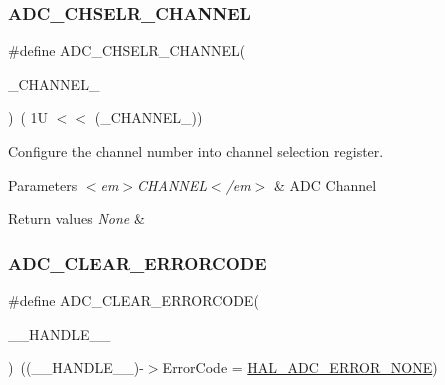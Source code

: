 \subsubsection{\texorpdfstring{A\+D\+C\+\_\+\+C\+H\+S\+E\+L\+R\+\_\+\+C\+H\+A\+N\+N\+EL}{ADC\_CHSELR\_CHANNEL}}
{\footnotesize\ttfamily \#define A\+D\+C\+\_\+\+C\+H\+S\+E\+L\+R\+\_\+\+C\+H\+A\+N\+N\+EL(\begin{DoxyParamCaption}\item[{}]{\+\_\+\+C\+H\+A\+N\+N\+E\+L\+\_\+ }\end{DoxyParamCaption})~( 1\+U $<$$<$ (\+\_\+\+C\+H\+A\+N\+N\+E\+L\+\_\+))}



Configure the channel number into channel selection register. 


\begin{DoxyParams}{Parameters}
{\em $<$em$>$\+C\+H\+A\+N\+N\+E\+L$<$/em$>$} & A\+DC Channel \\
\hline
\end{DoxyParams}

\begin{DoxyRetVals}{Return values}
{\em None} & \\
\hline
\end{DoxyRetVals}
\mbox{\label{group___a_d_c___private___macros_gac7ab87a3ab932eed1b3ac5faad4e3aa9}} 
\subsubsection{\texorpdfstring{A\+D\+C\+\_\+\+C\+L\+E\+A\+R\+\_\+\+E\+R\+R\+O\+R\+C\+O\+DE}{ADC\_CLEAR\_ERRORCODE}}
{\footnotesize\ttfamily \#define A\+D\+C\+\_\+\+C\+L\+E\+A\+R\+\_\+\+E\+R\+R\+O\+R\+C\+O\+DE(\begin{DoxyParamCaption}\item[{}]{\+\_\+\+\_\+\+H\+A\+N\+D\+L\+E\+\_\+\+\_\+ }\end{DoxyParamCaption})~((\+\_\+\+\_\+\+H\+A\+N\+D\+L\+E\+\_\+\+\_\+)-\/$>$Error\+Code = \hyperlink{group___a_d_c___error___code_ga93b4576d46ee0f8c53b7d69f39778e38}{H\+A\+L\+\_\+\+A\+D\+C\+\_\+\+E\+R\+R\+O\+R\+\_\+\+N\+O\+NE})}



